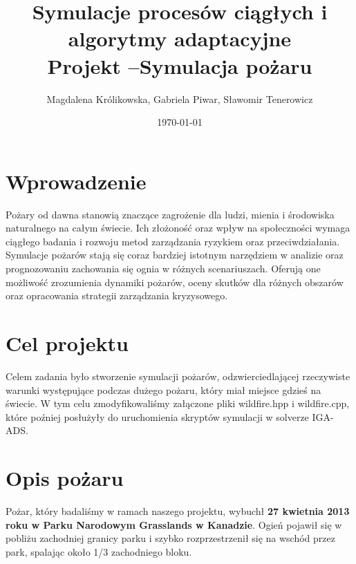 \documentclass[a4paper,12pt]{article}
\begin{document}
\title{Symulacje procesów ciągłych i algorytmy adaptacyjne\\
Projekt –Symulacja pożaru}
\author{Magdalena Królikowska, Gabriela Piwar, Sławomir Tenerowicz}
\date{\today}
\maketitle

\tableofcontents
\thispagestyle{empty}

\section{Wprowadzenie}
Pożary od dawna stanowią znaczące zagrożenie dla ludzi, mienia i środowiska naturalnego na całym świecie. Ich złożoność oraz wpływ na społeczności wymaga ciągłego badania i rozwoju metod zarządzania ryzykiem oraz przeciwdziałania. Symulacje pożarów stają się coraz bardziej istotnym narzędziem w analizie oraz prognozowaniu zachowania się ognia w różnych scenariuszach. Oferują one możliwość zrozumienia dynamiki pożarów, oceny skutków dla różnych obszarów oraz opracowania strategii zarządzania kryzysowego. 

\section{Cel projektu}
Celem zadania było stworzenie symulacji pożarów, odzwierciedlającej rzeczywiste warunki występujące podczas dużego pożaru, który miał miejsce gdzieś na świecie. W tym celu zmodyfikowaliśmy załączone pliki wildfire.hpp i wildfire.cpp, które poźniej posłużyły do uruchomienia skryptów symulacji w solverze IGA-ADS.  

\section{Opis pożaru}
Pożar, który badaliśmy w ramach naszego projektu, wybuchł \textbf{27 kwietnia 2013 roku w Parku Narodowym Grasslands w Kanadzie}. Ogień pojawił się w pobliżu zachodniej granicy parku i szybko rozprzestrzenił się na wschód przez park, spalając około 1/3 zachodniego bloku. 
\end{document}
